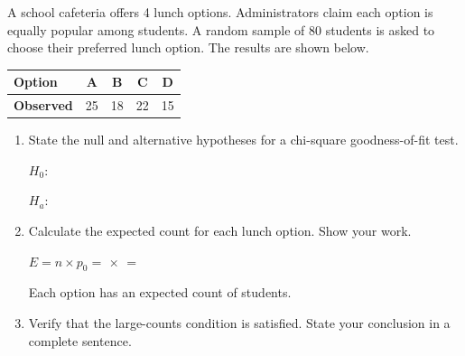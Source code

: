 \documentclass[10pt]{article}
\begin{document}
\namedateperiod

\vspace{0.15in}

A school cafeteria offers 4 lunch options. Administrators claim each option is equally
popular among students. A random sample of 80 students is asked to choose their
preferred lunch option. The results are shown below.

\renewcommand{\arraystretch}{1.5}
\begin{center}
\begin{tabular}{lcccc}
    \textbf{Option}   & A  & B  & C  & D  \\
    \hline
    \textbf{Observed} & 25 & 18 & 22 & 15 \\
\end{tabular}
\end{center}

\vspace{0.1in}

\begin{enumerate}

  \item State the null and alternative hypotheses for a chi-square goodness-of-fit test.

        \vspace{0.1in}
        $H_0$: 

        \vspace{0.05in}
        $H_a$: 

        \vspace{0.1in}

  \item Calculate the expected count for each lunch option. Show your work.

        \vspace{0.08in}
        $E = n \times p_0 =$  $\times$  $=$ 

        \vspace{0.1in}
        Each option has an expected count of  students.

        \vspace{0.1in}

  \item Verify that the large-counts condition is satisfied. State your conclusion in a
        complete sentence.


\end{enumerate}
\end{document}
